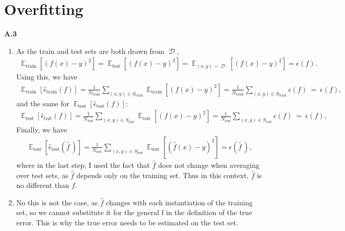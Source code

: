 \documentclass{article}
\DeclareMathOperator{\E}{\mathbb{E}}
\DeclareMathOperator{\D}{\mathcal{D}}
\begin{document}
\section*{Overfitting}

\textbf{A.3}
\begin{enumerate}
        \item
        As the train and test sets are both drawn from $\D$, 
        \begin{align*}
                \E_\text{train} \left[ (f(x) - y)^2 \right] 
                = \E_\text{test} \left[ (f(x) - y)^2 \right] 
                = \E_{(x,y) \sim \D} \left[ (f(x) - y)^2 \right]
                = \epsilon(f).
        \end{align*}
        Using this, we have
        \begin{align*}
                \E_\text{train} [\hat{\epsilon}_\text{train} (f)]
                = \frac{1}{N_\text{train}} \sum_{(x,y) \in S_\text{train}} \E_\text{train} \left[ (f(x) - y)^2 \right]
                = \frac{1}{N_\text{train}} \sum_{(x,y) \in S_\text{train}} \epsilon(f)
                ~ = ~ \epsilon(f),
        \end{align*}
        and the same for $\E_\text{test}[\hat{\epsilon}_\text{test}(f)]$:
        \begin{align*}
                \E_\text{test} [\hat{\epsilon}_\text{test} (f)]
                = \frac{1}{N_\text{test}} \sum_{(x,y) \in S_\text{test}} \E_\text{test} \left[ (f(x) - y)^2 \right]
                = \frac{1}{N_\text{test}} \sum_{(x,y) \in S_\text{test}} \epsilon(f)
                ~ = ~ \epsilon(f),
        \end{align*}
        Finally, we have
        \begin{align*}
                \E_\text{test}[\hat{\epsilon}_\text{test}(\hat{f}\,)]
                = \frac{1}{N_\text{test}} \sum_{(x,y) \in S_\text{test}} \E_\text{test} \left[ (\hat{f}(x) - y)^2 \right] = \epsilon(\hat{f}\,),
        \end{align*}
        where in the last step, I used the fact that $\hat{f}$ does not change when averaging over test sets, as $\hat{f}$ depends only on the training set.
        Thus in this context, $\hat{f}$ is no different than $f$.

        \item
        No this is not the case, as $\hat{f}$ changes with each instantiation of the training set, so we cannot substitute it for the general f in the definition of the true error.
        This is why the true error needs to be estimated on the test set.


\end{enumerate}
\end{document}
